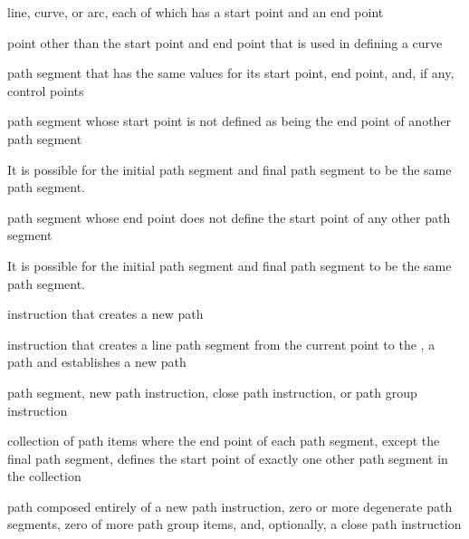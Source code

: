 
%
line, \bezierlocal curve, or arc, each of which has a start point and an end point

%
point other than the start point and end point that is used in defining a \bezierlocal curve

%
path segment that has the same values for its start point, end point, and, if any, control points

%
path segment whose start point is not defined as being the end point of another path segment
\begin{note}
It is possible for the initial path segment and final path segment to be the same path segment.
\end{note}

%
path segment whose end point does not define the start point of any other path segment
\begin{note}
It is possible for the initial path segment and final path segment to be the same path segment.
\end{note}

%
 instruction that creates a new path

%
 instruction that creates a line path segment from the current point to the , a path and establishes a new path

%
path segment, new path instruction, close path instruction, or path group instruction

%
collection of path items where the end point of each path segment, except the final path segment, defines the start point of exactly one other path segment in the collection

%
path composed entirely of a new path instruction, zero or more degenerate path segments, zero of more path group items, and, optionally, a close path instruction

